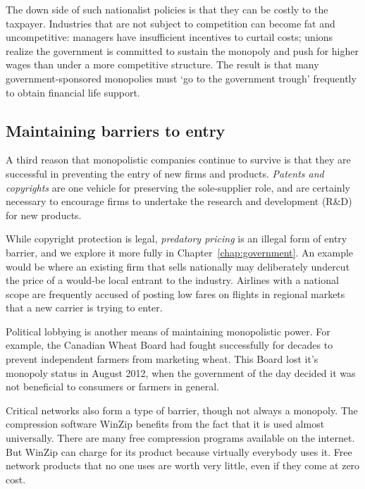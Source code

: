 The down side of such nationalist policies is that they can be costly to the taxpayer. Industries that are not subject to competition can become fat and uncompetitive: managers have insufficient incentives to curtail costs; unions realize the government is committed to sustain the monopoly and push for higher wages than under a more competitive structure. The result is that many government-sponsored monopolies must `go to the government trough' frequently to obtain financial life support. 

\subsection*{Maintaining barriers to entry}

A third reason that monopolistic companies continue to survive is that they are successful in preventing the entry of new firms and products. \textit{Patents and copyrights} are one vehicle for preserving the sole-supplier role, and are certainly necessary to encourage firms to undertake the research and development (R\&D) for new products.  

While copyright protection is legal, \textit{predatory pricing} is an illegal form of entry barrier, and we explore it more fully in Chapter~\ref{chap:government}. An example would be where an existing firm that sells nationally may deliberately undercut the price of a would-be local entrant to the industry.  Airlines with a national scope are frequently accused of posting low fares on flights in regional markets that a new carrier is trying to enter. 

Political lobbying is another means of maintaining monopolistic power. For example, the Canadian Wheat Board had fought successfully for decades to prevent independent farmers from marketing wheat. This Board lost it's monopoly status in August 2012, when the government of the day decided it was not beneficial to consumers or farmers in general. 

Critical networks also form a type of barrier, though not always a monopoly. The compression software WinZip benefits from the fact that it is used almost universally.  There are many free compression programs available on the internet. But WinZip can charge for its product because virtually everybody uses it. Free network products that no one uses are worth very little, even if they come at zero cost.

